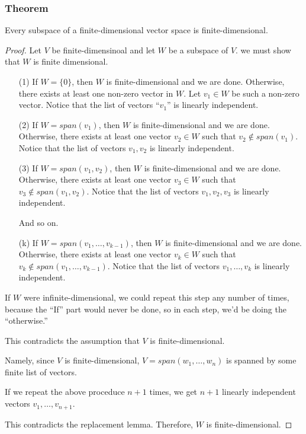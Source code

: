 \documentclass[11pt]{article}
\begin{document}
    \subsubsection{Theorem}

    Every subspace of a finite-dimensional vector space is finite-dimensional.

    \begin{proof}
        Let $V$ be finite-dimensinoal and let $W$ be a subspace of $V$. we must show that $W$ is finite dimensional.
        \begin{enumerate}
            \item[(1)] If \(W = \{0\}\), then $W$ is finite-dimensional and we are done. Otherwise, there exists at least one non-zero vector in $W$. Let \(v_1 \in W\) be such a non-zero vector. Notice that the list of vectors ``\(v_1\)'' is linearly independent.
            \item[(2)] If \(W = span(v_1)\), then $W$ is finite-dimensional and we are done. Otherwise, there exists at least one vector \(v_2 \in W\) such that \(v_2 \notin span(v_1)\). Notice that the list of vectors \(v_1, v_2\) is linearly independent.
            \item[(3)] If \(W = span(v_1,v_2)\), then $W$ is finite-dimensional and we are done. Otherwise, there exists at least one vector \(v_3 \in W\) such that \(v_3 \notin span(v_1,v_2)\). Notice that the list of vectors \(v_1, v_2, v_3\) is linearly independent.
            
            And so on.

            \item[(k)] If \(W = span(v_1, \dots, v_{k-1})\), then $W$ is finite-dimensional and we are done. Otherwise, there exists at least one vector \(v_k \in W\) such that \(v_k \notin span(v_1, \dots, v_{k-1})\). Notice that the list of vectors \(v_1, \dots, v_k\) is linearly independent.  
        \end{enumerate}

        If $W$ were infinite-dimensional, we could repeat this step any number of times, because the ``If'' part would never be done, so in each step, we'd be doing the ``otherwise.''

        This contradicts the assumption that $V$ is finite-dimensional.

        Namely, since $V$ is finite-dimensional, \(V = span(w_1, \dots, w_n)\) is spanned by some finite list of vectors.

        If we repeat the above proceduce \(n+1\) times, we get \(n+1\) linearly independent vectors \(v_1, \dots, v_{n+1}\).

        This contradicts the replacement lemma. Therefore, $W$ is finite-dimensional.
    \end{proof}
\end{document}
